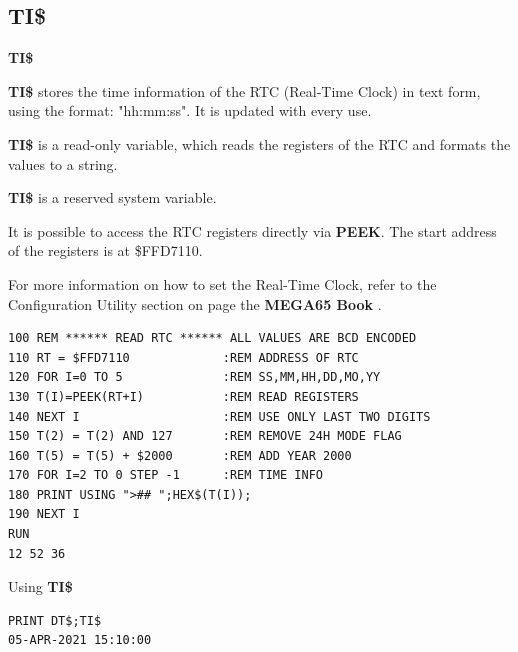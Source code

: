 \subsection{TI\$}
\begin{description}[leftmargin=2cm,style=nextline]
\item [Format:] {\bf TI\$}
\item [Usage:]  {\bf TI\$} stores the time information of the RTC
                (Real-Time Clock) in text form, using the format:
                "hh:mm:ss". It is updated with every use.

                {\bf TI\$} is a read-only variable, which
                reads the registers of the RTC and formats the values
                to a string.

\item [Remarks:]
                {\bf TI\$} is a reserved system variable.

                It is possible to access the RTC registers directly
                via {\bf PEEK}. The start address of the registers is at
                \$FFD7110.

                For more information on how to set the Real-Time Clock,
                refer to the Configuration Utility section on page
\ifdefined\printmanual
the {\bf MEGA65 Book}
\else
\fi
				.

\begin{tcolorbox}[colback=black,coltext=white]
\verbatimfont{\codefont}
\begin{verbatim}
100 REM ****** READ RTC ****** ALL VALUES ARE BCD ENCODED
110 RT = $FFD7110             :REM ADDRESS OF RTC
120 FOR I=0 TO 5              :REM SS,MM,HH,DD,MO,YY
130 T(I)=PEEK(RT+I)           :REM READ REGISTERS
140 NEXT I                    :REM USE ONLY LAST TWO DIGITS
150 T(2) = T(2) AND 127       :REM REMOVE 24H MODE FLAG
160 T(5) = T(5) + $2000       :REM ADD YEAR 2000
170 FOR I=2 TO 0 STEP -1      :REM TIME INFO
180 PRINT USING ">## ";HEX$(T(I));
190 NEXT I
RUN
12 52 36
\end{verbatim}
\end{tcolorbox}

\item [Example:] Using {\bf TI\$}
\begin{tcolorbox}[colback=black,coltext=white]
\verbatimfont{\codefont}
\begin{verbatim}
PRINT DT$;TI$
05-APR-2021 15:10:00
\end{verbatim}
\end{tcolorbox}
\end{description}

